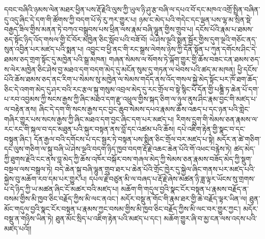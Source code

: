 \documentclass{article}
\begin{document}
དབང་བཞིའི་ཉམས་ལེན་མཐར་ཕྱིན་པས་རྡོ་རྗེའི་ལུས་ཀྱི་ཡུལ་ཉི་ཤུ་རྩ་བཞི་ལ་དཔའ་བོ་དང་མཁའ་འགྲོ་སྤྲིན་བཞིན་དུ་འདུ་ཞིང་དེ་དག་གི་ཚོགས་ཀྱི་བདག་པོ་ཧེ་རུ་ཀར་གྱུར་པ། ཉམ་ང་མེད་པའི་གདེང་དང་ལྡན་པས་ལྷ་མ་སྲིན་སྡེ་བརྒྱད་ཟིལ་གྱིས་མནན་ཏེ་བཀའ་བསྒྲུབས་པས་ཕྲིན་ལས་རྣམ་བཞི་ལྷུན་གྱིས་གྲུབ་པ། དངོས་པོའི་རྣམ་པ་ཐམས་ཅད་སྟོང་ཉིད་འོད་གསལ་གྱི་ངོ་བོར་མཁྱེན་ཅིང་སློབ་པའི་བཟོ་བོ། ཡེ་ཤེས་ལྔའི་སྨན་སྦྱོར་གྱིས་དུག་ལྔའི་གཅོང་ནད་སུན་འབྱིན་པར་མཛད་པའི་སྨན་པ། འབྱུང་བ་ཕྱི་ནང་གི་རང་སྒྲས་ལེགས་ཉེས་ཀྱི་དོན་སྟོན་པ་ཀུན་དགོངས་ཤིང་དེ་ཐམས་ཅད་གྲག་སྟོང་དུ་མཁྱེན་པའི་སྒྲ་མཁན། གཞན་སེམས་ལ་སོགས་ཏེ་ལྐོག་གྱུར་གྱི་ཆོས་བཟང་ངན་ཐམས་ཅད་ས་ལེར་མཁྱེན་ཅིང་ཤེས་བྱ་མཐའ་དག་བདག་མེད་དུ་མངོན་སུམ་དུ་གཏན་ལ་ཕེབས་པའི་ཚད་མ་མཁན། ཕྱི་དངོས་པོའི་ཆོས་ཐམས་ཅད་ནང་རིག་པ་སེམས་སུ་མཁྱེན་ལ་སེམས་གདོད་ནས་འོད་གསལ་སྐྱེ་མེད་སྟོང་པར་ཁོ་ཐག་ཆོད་ཅིང་དེ་འགག་མེད་དུ་ཤར་བའི་རང་རྩལ་སྐུ་གསུམ་འབྲལ་མེད་དུ་རང་གྲོལ་བ་སྟེ་སྙིང་པོ་དོན་གྱི་པཎྜྻི་ཏ་ཆེན་པོ་དག་པ་རབ་འབྱམས་ཀྱི་སངས་རྒྱས་ཀྱི་ཞིང་མཐའ་དག་རྫུ་འཕྲུལ་གྱིས་སྐད་ཅིག་ལ་ཉུལ་ནུས་ཤིང་རྣམ་བྱང་གི་མཛད་པ་ལ་བརྟེན་ནས། ཞིང་དེ་དག་གི་སངས་རྒྱས་དང་བྱང་ཆུབ་སེམས་དཔའ་རྣམས་ཆོས་འཆད་པ་དང་ཉན་པའི་གླེང་གཞིར་གྱུར་པས་སངས་རྒྱས་ཀྱི་ཞིང་མཐའ་དག་བྱང་ཞིང་དག་པར་མཛད་པ། རིགས་དྲུག་གི་སེམས་ཅན་རྣམས་ལ་རང་རང་གི་སྐལ་བ་དང་མཐུན་པའི་སྐུར་བསྟན་ནས་བློ་དང་འཚམ་པའི་ཆོས། དཔེ་འཇིག་རྟེན་གྱི་སྣང་བ་དང་བསྟུན་ཞིང་། དོན་རྒྱལ་བའི་དགོངས་པ་དང་སྦྱར་ཏེ་བསྟན་པས་སྨིན་ཅིང་གྲོལ་བར་མཛད་པ་སྟེ། མདོར་ན་ཚེ་གཅིག་དང་ལུས་གཅིག་ལ་སྐུ་བཞི་ཡེ་ཤེས་ལྔའི་བདག་ཉིད་ཁྱབ་བདག་རྡོ་རྗེ་འཆང་ཆེན་པོའི་གོ་འཕང་བརྙེས་ཏེ། ཚད་མེད་ཀྱི་ཐུགས་རྗེའི་ངང་ནས་བླ་མེད་ཀྱི་ཆོས་འཁོར་བསྐོར་བས་གཞལ་མེད་ཀྱི་སེམས་ཅན་རྣམས་བཟོད་མེད་ཀྱི་སྡུག་བསྔལ་ལས་བསྒྲལ་ཏེ། བདེ་ཆེན་སྐུ་བཞི་ལྷུན་གྲུབ་ཐར་པ་ཆེན་པོའི་གྲོང་ཁྱེར་དུ་སྐྱེལ་ཞིང་གནས་པར་མཛད་པའི་སྐྱེས་བུ་མཆོག་རབ་དམ་པར་གྱུར་པ། དཔལ་རྗེ་བཙུན་མི་ལ་བཞད་པ་རྡོ་རྗེ་ཞེས་མཚན་ཉི་ཟླ་ལྟར་ཡོངས་སུ་གྲགས་པ་དེ་ཉིད་ཀྱི་ཡ་མཚན་ཞིང་ངོ་མཚར་བའི་མཛད་པ། མཆོག་གི་གདུལ་བྱའི་སྣང་ངོར་བསྟན་པ་རྣམས་བརྗོད་ན་བསམ་གྱིས་མི་ཁྱབ་ཅིང་བརྗོད་ཀྱིས་མི་ལང་ནའང་། མདོར་བསྡུ་ན་གོང་གི་རྣམ་ཐར་གྱི་ཆེ་བརྗོད་ལྟར་ཡིན་ལ། ཐུན་མོང་གདུལ་བྱའི་སྣང་ངོར་བསྟན་པ་རྣམས་ཀྱང་བསམ་གྱིས་མི་ཁྱབ་ཅིང་བརྗོད་ཀྱིས་མི་ལང་བར་གྱུར་ཀྱང་། མདོར་བསྡུ་ན་གཉིས་ཡིན་ཏེ། ཐུན་མོང་སྲིད་པ་འཇིག་རྟེན་པའི་མཛད་པ་དང་། མཆོག་གྱུར་ཞི་བ་མྱ་ངན་ལས་འདས་པའི་མཛད་པའོ།།
\end{document}
